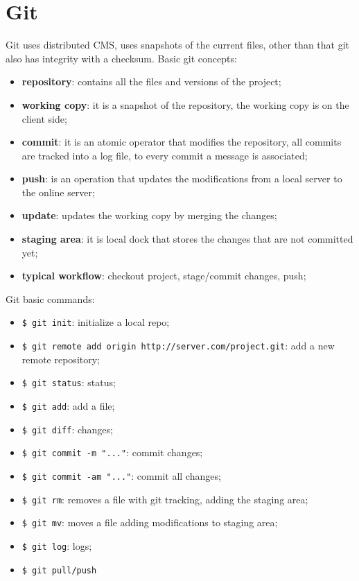 \documentclass[12pt]{article}
\begin{document}
\section{Git}
Git uses distributed CMS, uses snapshots of the current files, other than that git also has integrity with a checksum. Basic git concepts:
\begin{itemize}
    \item \textbf{repository}: contains all the files and versions of the project;
    \item \textbf{working copy}: it is a snapshot of the repository, the working copy is on the client side;
    \item \textbf{commit}: it is an atomic operator that modifies the repository, all commits are tracked into a log file, to every commit a message is associated;
    \item \textbf{push}: is an operation that updates the modifications from a local server to the online server;
    \item \textbf{update}: updates the working copy by merging the changes;
    \item \textbf{staging area}: it is local dock that stores the changes that are not committed yet;
    \item \textbf{typical workflow}: checkout project, stage/commit changes, push;
\end{itemize}
Git basic commands: 
\begin{itemize}
    \item \texttt{\$ git init}: initialize a local repo;
    \item \texttt{\$ git remote add origin http://server.com/project.git}: add a new remote repository;
    \item \texttt{\$ git status}: status;
    \item \texttt{\$ git add}: add a file;
    \item \texttt{\$ git diff}: changes;
    \item \texttt{\$ git commit -m "..."}: commit changes;
    \item \texttt{\$ git commit -am "..."}: commit all changes;
    \item \texttt{\$ git rm}: removes a file with git tracking, adding the staging area;
    \item \texttt{\$ git mv}: moves a file adding modifications to staging area;
    \item \texttt{\$ git log}: logs;
    \item \texttt{\$ git pull/push}
\end{itemize}
\end{document}
